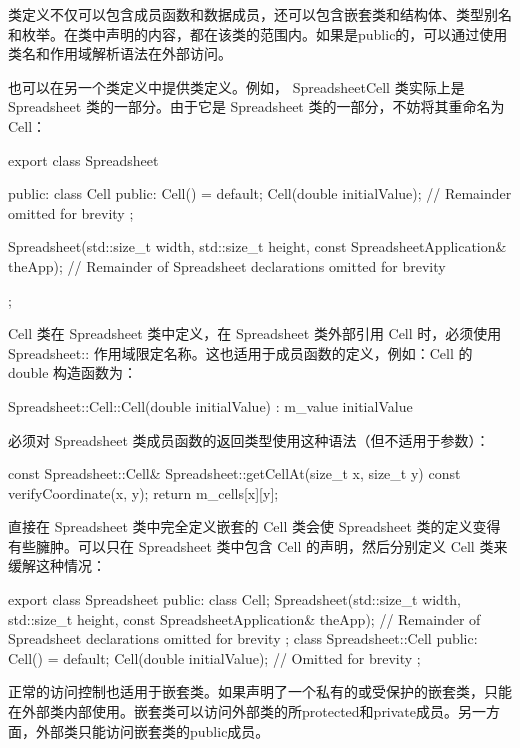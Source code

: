 类定义不仅可以包含成员函数和数据成员，还可以包含嵌套类和结构体、类型别名和枚举。在类中声明的内容，都在该类的范围内。如果是public的，可以通过使用 类名和作用域解析语法在外部访问。

也可以在另一个类定义中提供类定义。例如， SpreadsheetCell 类实际上是 Spreadsheet 类的一部分。由于它是 Spreadsheet 类的一部分，不妨将其重命名为 Cell：

\begin{cpp}
export class Spreadsheet
{
    public:
        class Cell
        {
            public:
                Cell() = default;
                Cell(double initialValue);
                // Remainder omitted for brevity
        };

        Spreadsheet(std::size_t width, std::size_t height,
            const SpreadsheetApplication& theApp);
        // Remainder of Spreadsheet declarations omitted for brevity
};
\end{cpp}

Cell 类在 Spreadsheet 类中定义，在 Spreadsheet 类外部引用 Cell 时，必须使用 Spreadsheet:: 作用域限定名称。这也适用于成员函数的定义，例如：Cell 的 double 构造函数为：

\begin{cpp}
Spreadsheet::Cell::Cell(double initialValue)
    : m_value { initialValue }
{}
\end{cpp}

必须对 Spreadsheet 类成员函数的返回类型使用这种语法（但不适用于参数）：

\begin{cpp}
const Spreadsheet::Cell& Spreadsheet::getCellAt(size_t x, size_t y) const
{
    verifyCoordinate(x, y);
    return m_cells[x][y];
}
\end{cpp}

直接在 Spreadsheet 类中完全定义嵌套的 Cell 类会使 Spreadsheet 类的定义变得有些臃肿。可以只在 Spreadsheet 类中包含 Cell 的声明，然后分别定义 Cell 类来缓解这种情况：

\begin{cpp}
export class Spreadsheet
{
    public:
        class Cell;
        Spreadsheet(std::size_t width, std::size_t height,
            const SpreadsheetApplication& theApp);
        // Remainder of Spreadsheet declarations omitted for brevity
};
class Spreadsheet::Cell
{
    public:
        Cell() = default;
        Cell(double initialValue);
        // Omitted for brevity
};
\end{cpp}

正常的访问控制也适用于嵌套类。如果声明了一个私有的或受保护的嵌套类，只能在外部类内部使用。嵌套类可以访问外部类的所protected和private成员。另一方面，外部类只能访问嵌套类的public成员。











